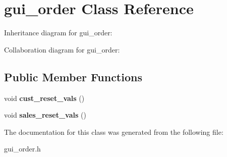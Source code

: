 \hypertarget{classgui__order}{}\section{gui\+\_\+order Class Reference}
\label{classgui__order}


Inheritance diagram for gui\+\_\+order\+:


Collaboration diagram for gui\+\_\+order\+:
\subsection*{Public Member Functions}
\begin{DoxyCompactItemize}
\item 
void {\bfseries cust\+\_\+reset\+\_\+vals} ()\hypertarget{classgui__order_a8236b7e04a7778b376eeac676b75e60c}{}\label{classgui__order_a8236b7e04a7778b376eeac676b75e60c}

\item 
void {\bfseries sales\+\_\+reset\+\_\+vals} ()\hypertarget{classgui__order_afb74a05f6de14dc9090d1b12c4d0ea19}{}\label{classgui__order_afb74a05f6de14dc9090d1b12c4d0ea19}

\end{DoxyCompactItemize}


The documentation for this class was generated from the following file\+:\begin{DoxyCompactItemize}
\item 
gui\+\_\+order.\+h\end{DoxyCompactItemize}
